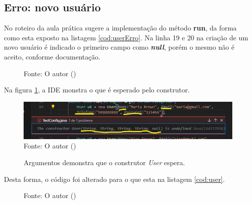 \subsection{Erro: novo usuário}

\par No roteiro da aula prática sugere a implementação do método \textbf{run}, da forma como esta exposto na listagem \ref{cod:userErro}. Na linha 19 e 20 na criação de um novo usuário é indicado o primeiro campo como \textit{\textbf{null}}, porém o mesmo não é aceito, conforme documentação.

\begin{figure}[H]
  \flushleft %
    {\fontsize{10pt}{\baselineskip}\selectfont  Fonte: O autor (\the\year) }
\end{figure}

\par Na figura \ref{fig:sugconstrutor}, a IDE monstra o que é esperado pelo construtor.

\begin{figure}[H]
  \caption{Argumentos demonstra que o construtor \textit{User} espera.}
  \includegraphics[scale=0.8]{figure/user_jaova.png}
  \label{fig:sugconstrutor}
  \flushleft %
  {\fontsize{10pt}{\baselineskip}\selectfont  Fonte: O autor (\the\year) }
\end{figure}
\par Desta forma, o código foi alterado para o que esta na listagem \ref{cod:user}.


\begin{figure}[H]
  \flushleft %
  {\fontsize{10pt}{\baselineskip}\selectfont  Fonte: O autor (\the\year) }
\end{figure}





